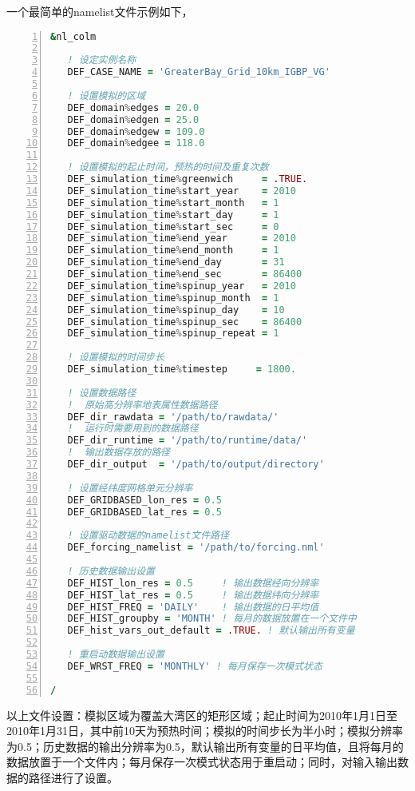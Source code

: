 一个最简单的namelist文件示例如下，
\begin{lstlisting}[language=fortran, basicstyle=\linespread{1.2}\footnotesize\ttfamily, commentstyle=\color{black}, numbers=left, numberstyle=\tiny, xleftmargin=1.5em,xrightmargin=0em, aboveskip=1em]
&nl_colm

   ! 设定实例名称
   DEF_CASE_NAME = 'GreaterBay_Grid_10km_IGBP_VG'

   ! 设置模拟的区域
   DEF_domain%edges = 20.0
   DEF_domain%edgen = 25.0
   DEF_domain%edgew = 109.0
   DEF_domain%edgee = 118.0

   ! 设置模拟的起止时间，预热的时间及重复次数
   DEF_simulation_time%greenwich     = .TRUE.
   DEF_simulation_time%start_year    = 2010
   DEF_simulation_time%start_month   = 1
   DEF_simulation_time%start_day     = 1
   DEF_simulation_time%start_sec     = 0
   DEF_simulation_time%end_year      = 2010
   DEF_simulation_time%end_month     = 1
   DEF_simulation_time%end_day       = 31
   DEF_simulation_time%end_sec       = 86400
   DEF_simulation_time%spinup_year   = 2010
   DEF_simulation_time%spinup_month  = 1
   DEF_simulation_time%spinup_day    = 10
   DEF_simulation_time%spinup_sec    = 86400
   DEF_simulation_time%spinup_repeat = 1

   ! 设置模拟的时间步长
   DEF_simulation_time%timestep     = 1800.

   ! 设置数据路径
   !  原始高分辨率地表属性数据路径
   DEF_dir_rawdata = '/path/to/rawdata/'   
   !  运行时需要用到的数据路径
   DEF_dir_runtime = '/path/to/runtime/data/'   
   !  输出数据存放的路径
   DEF_dir_output  = '/path/to/output/directory'  

   ! 设置经纬度网格单元分辨率
   DEF_GRIDBASED_lon_res = 0.5
   DEF_GRIDBASED_lat_res = 0.5

   ! 设置驱动数据的namelist文件路径
   DEF_forcing_namelist = '/path/to/forcing.nml'

   ! 历史数据输出设置
   DEF_HIST_lon_res = 0.5     ! 输出数据经向分辨率
   DEF_HIST_lat_res = 0.5     ! 输出数据纬向分辨率
   DEF_HIST_FREQ = 'DAILY'    ! 输出数据的日平均值
   DEF_HIST_groupby = 'MONTH' ! 每月的数据放置在一个文件中
   DEF_hist_vars_out_default = .TRUE. ! 默认输出所有变量

   ! 重启动数据输出设置
   DEF_WRST_FREQ = 'MONTHLY' ! 每月保存一次模式状态

/
\end{lstlisting}

以上文件设置：模拟区域为覆盖大湾区的矩形区域；起止时间为2010年1月1日至2010年1月31日，其中前10天为预热时间；模拟的时间步长为半小时；模拟分辨率为0.5\textdegree；历史数据的输出分辨率为0.5\textdegree，默认输出所有变量的日平均值，且将每月的数据放置于一个文件内；每月保存一次模式状态用于重启动；同时，对输入输出数据的路径进行了设置。


